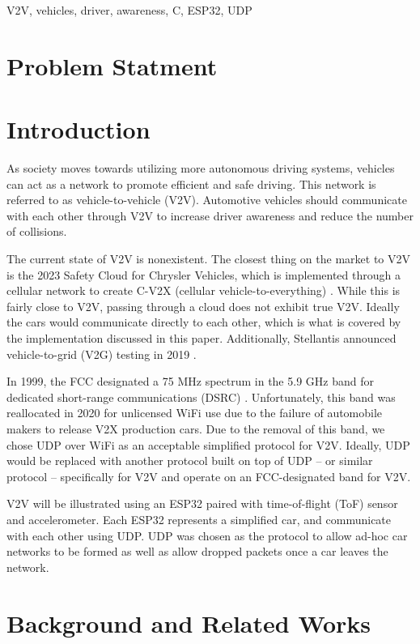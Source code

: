 \documentclass[conference]{IEEEtran}
\begin{document}
\begin{IEEEkeywords}
V2V, vehicles, driver, awareness, C, ESP32, UDP
\end{IEEEkeywords}

\section{Problem Statment}

\section{Introduction}
As society moves towards utilizing more autonomous driving systems, vehicles can
act as a network to promote efficient and safe driving. This network is referred
to as vehicle-to-vehicle (V2V). Automotive vehicles should communicate with each
other through V2V to increase driver awareness and reduce the number of
collisions.

The current state of V2V is nonexistent. The closest thing on the market to V2V
is the 2023 Safety Cloud for Chrysler Vehicles, which is implemented through a
cellular network to create C-V2X (cellular vehicle-to-everything)
\cite{stone_2023, haas}.  While this is fairly close to V2V, passing through a
cloud does not exhibit true V2V. Ideally the cars would communicate directly to
each other, which is what is covered by the implementation discussed in this
paper. Additionally, Stellantis announced vehicle-to-grid (V2G) testing in 2019
\cite{media.stellantis_2020}.

In 1999, the FCC designated a 75 MHz spectrum in the 5.9 GHz band for dedicated
short-range communications (DSRC) \cite{hawkins_2022}. Unfortunately, this band was
reallocated in 2020 for unlicensed WiFi \cite{hawkins_2022} use due to the
failure of automobile makers to release V2X production cars. Due to the removal
of this band, we chose UDP over WiFi as an acceptable simplified protocol for
V2V. Ideally, UDP would be replaced with another protocol built on top of UDP --
or similar protocol -- specifically for V2V and operate on an FCC-designated
band for V2V.

V2V will be illustrated using an ESP32 paired with time-of-flight (ToF) sensor
and accelerometer. Each ESP32 represents a simplified car, and communicate with
each other using UDP. UDP was chosen as the protocol to allow ad-hoc car
networks to be formed as well as allow dropped packets once a car leaves the
network.

\section{Background and Related Works}
\end{document}
